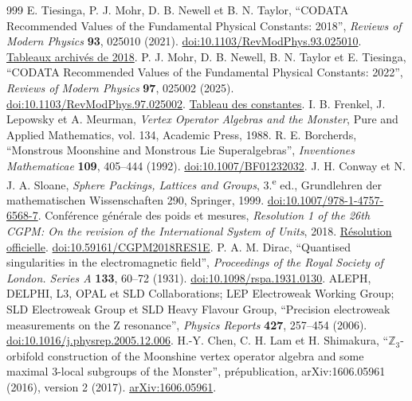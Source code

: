 \begin{thebibliography}{999}
 E. Tiesinga, P. J. Mohr, D. B. Newell et B. N. Taylor, ``CODATA Recommended Values of the Fundamental Physical Constants: 2018'', \emph{Reviews of Modern Physics} \textbf{93}, 025010 (2021). \href{https://doi.org/10.1103/RevModPhys.93.025010}{doi:10.1103/RevModPhys.93.025010}. \href{https://physics.nist.gov/cuu/Constants/ArchiveASCII/allascii_2018.txt}{Tableaux archivés de 2018}.
 P. J. Mohr, D. B. Newell, B. N. Taylor et E. Tiesinga, ``CODATA Recommended Values of the Fundamental Physical Constants: 2022'', \emph{Reviews of Modern Physics} \textbf{97}, 025002 (2025). \href{https://doi.org/10.1103/RevModPhys.97.025002}{doi:10.1103/RevModPhys.97.025002}. \href{https://physics.nist.gov/cuu/Constants/Table/allascii.txt}{Tableau des constantes}.
 I. B. Frenkel, J. Lepowsky et A. Meurman, \emph{Vertex Operator Algebras and the Monster}, Pure and Applied Mathematics, vol. 134, Academic Press, 1988.
 R. E. Borcherds, ``Monstrous Moonshine and Monstrous Lie Superalgebras'', \emph{Inventiones Mathematicae} \textbf{109}, 405--444 (1992). \href{https://doi.org/10.1007/BF01232032}{doi:10.1007/BF01232032}.
 J. H. Conway et N. J. A. Sloane, \emph{Sphere Packings, Lattices and Groups}, 3.\textsuperscript{e} ed., Grundlehren der mathematischen Wissenschaften 290, Springer, 1999. \href{https://doi.org/10.1007/978-1-4757-6568-7}{doi:10.1007/978-1-4757-6568-7}.
 Conférence générale des poids et mesures, \emph{Resolution 1 of the 26th CGPM: On the revision of the International System of Units}, 2018. \href{https://www.bipm.org/en/committees/cg/cgpm/26-2018/resolution-1}{Résolution officielle}. \href{https://doi.org/10.59161/CGPM2018RES1E}{doi:10.59161/CGPM2018RES1E}.
 P. A. M. Dirac, ``Quantised singularities in the electromagnetic field'', \emph{Proceedings of the Royal Society of London. Series A} \textbf{133}, 60--72 (1931). \href{https://doi.org/10.1098/rspa.1931.0130}{doi:10.1098/rspa.1931.0130}.
 ALEPH, DELPHI, L3, OPAL et SLD Collaborations; LEP Electroweak Working Group; SLD Electroweak Group et SLD Heavy Flavour Group, ``Precision electroweak measurements on the Z resonance'', \emph{Physics Reports} \textbf{427}, 257--454 (2006). \href{https://doi.org/10.1016/j.physrep.2005.12.006}{doi:10.1016/j.physrep.2005.12.006}.
 H.-Y. Chen, C. H. Lam et H. Shimakura, ``\(\mathbb Z_3\)-orbifold construction of the Moonshine vertex operator algebra and some maximal \(3\)-local subgroups of the Monster'', prépublication, arXiv:1606.05961 (2016), version 2 (2017). \href{https://arxiv.org/abs/1606.05961}{arXiv:1606.05961}.

\end{thebibliography}
